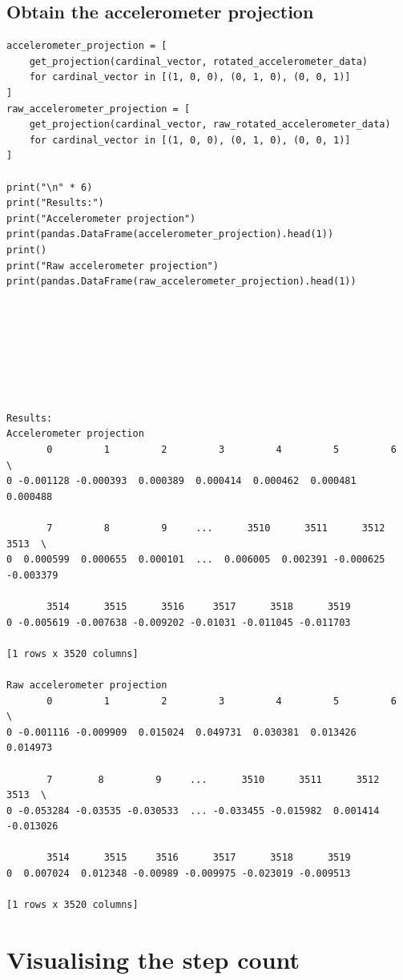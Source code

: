 \documentclass[12pt]{report}
\begin{document}
\subsection{Obtain the accelerometer projection}
\label{sec:orgaf06cff}
\begin{verbatim}
accelerometer_projection = [
    get_projection(cardinal_vector, rotated_accelerometer_data)
    for cardinal_vector in [(1, 0, 0), (0, 1, 0), (0, 0, 1)]
]
raw_accelerometer_projection = [
    get_projection(cardinal_vector, raw_rotated_accelerometer_data)
    for cardinal_vector in [(1, 0, 0), (0, 1, 0), (0, 0, 1)]
]

print("\n" * 6)
print("Results:")
print("Accelerometer projection")
print(pandas.DataFrame(accelerometer_projection).head(1))
print()
print("Raw accelerometer projection")
print(pandas.DataFrame(raw_accelerometer_projection).head(1))
\end{verbatim}

\label{org63dfb6c}
\begin{verbatim}







Results:
Accelerometer projection
       0         1         2         3         4         5         6     \
0 -0.001128 -0.000393  0.000389  0.000414  0.000462  0.000481  0.000488   

       7         8         9     ...      3510      3511      3512      3513  \
0  0.000599  0.000655  0.000101  ...  0.006005  0.002391 -0.000625 -0.003379   

       3514      3515      3516     3517      3518      3519  
0 -0.005619 -0.007638 -0.009202 -0.01031 -0.011045 -0.011703  

[1 rows x 3520 columns]

Raw accelerometer projection
       0         1         2         3         4         5         6     \
0 -0.001116 -0.009909  0.015024  0.049731  0.030381  0.013426  0.014973   

       7        8         9     ...      3510      3511      3512      3513  \
0 -0.053284 -0.03535 -0.030533  ... -0.033455 -0.015982  0.001414 -0.013026   

       3514      3515     3516      3517      3518      3519  
0  0.007024  0.012348 -0.00989 -0.009975 -0.023019 -0.009513  

[1 rows x 3520 columns]
\end{verbatim}
\section{Visualising the step count}
\label{sec:orgb7f7119}
\end{document}
